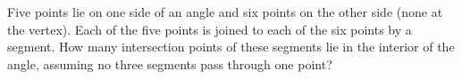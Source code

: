 Five points lie on one side of an angle and six points on the other side (none at the vertex). Each of the five points is joined to each of the six points by a segment. How many intersection points of these segments lie in the interior of the angle, assuming no three segments pass through one point?
